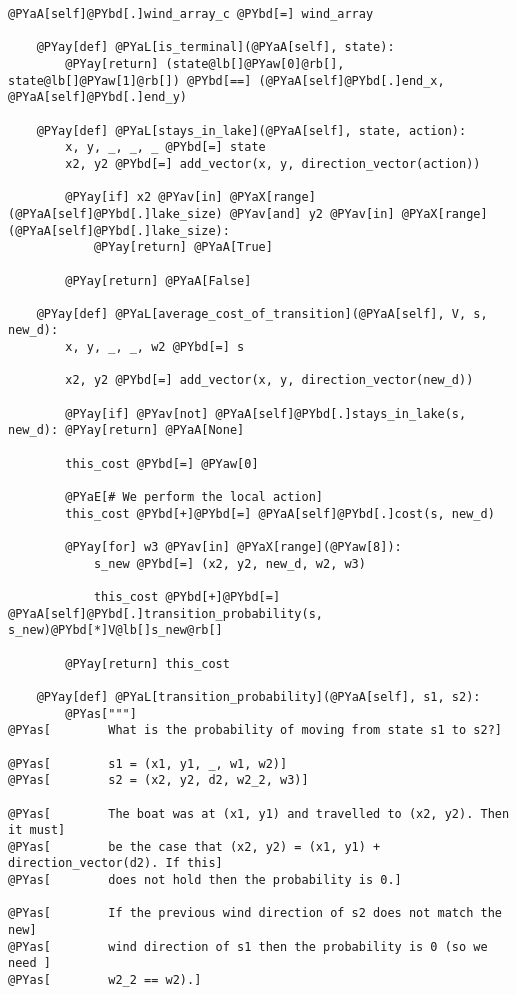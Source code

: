 \begin{Verbatim}[commandchars=@\[\]]
        @PYaA[self]@PYbd[.]wind_array_c @PYbd[=] wind_array

    @PYay[def] @PYaL[is_terminal](@PYaA[self], state):
        @PYay[return] (state@lb[]@PYaw[0]@rb[], state@lb[]@PYaw[1]@rb[]) @PYbd[==] (@PYaA[self]@PYbd[.]end_x, @PYaA[self]@PYbd[.]end_y)

    @PYay[def] @PYaL[stays_in_lake](@PYaA[self], state, action):
        x, y, _, _, _ @PYbd[=] state
        x2, y2 @PYbd[=] add_vector(x, y, direction_vector(action))

        @PYay[if] x2 @PYav[in] @PYaX[range](@PYaA[self]@PYbd[.]lake_size) @PYav[and] y2 @PYav[in] @PYaX[range](@PYaA[self]@PYbd[.]lake_size):
            @PYay[return] @PYaA[True]

        @PYay[return] @PYaA[False]

    @PYay[def] @PYaL[average_cost_of_transition](@PYaA[self], V, s, new_d):
        x, y, _, _, w2 @PYbd[=] s

        x2, y2 @PYbd[=] add_vector(x, y, direction_vector(new_d))

        @PYay[if] @PYav[not] @PYaA[self]@PYbd[.]stays_in_lake(s, new_d): @PYay[return] @PYaA[None]

        this_cost @PYbd[=] @PYaw[0]

        @PYaE[# We perform the local action]
        this_cost @PYbd[+]@PYbd[=] @PYaA[self]@PYbd[.]cost(s, new_d)

        @PYay[for] w3 @PYav[in] @PYaX[range](@PYaw[8]):
            s_new @PYbd[=] (x2, y2, new_d, w2, w3)

            this_cost @PYbd[+]@PYbd[=] @PYaA[self]@PYbd[.]transition_probability(s, s_new)@PYbd[*]V@lb[]s_new@rb[] 

        @PYay[return] this_cost

    @PYay[def] @PYaL[transition_probability](@PYaA[self], s1, s2):
        @PYas["""]
@PYas[        What is the probability of moving from state s1 to s2?]

@PYas[        s1 = (x1, y1, _, w1, w2)]
@PYas[        s2 = (x2, y2, d2, w2_2, w3)]

@PYas[        The boat was at (x1, y1) and travelled to (x2, y2). Then it must]
@PYas[        be the case that (x2, y2) = (x1, y1) + direction_vector(d2). If this]
@PYas[        does not hold then the probability is 0.]

@PYas[        If the previous wind direction of s2 does not match the new]
@PYas[        wind direction of s1 then the probability is 0 (so we need ]
@PYas[        w2_2 == w2).]


\end{Verbatim}
